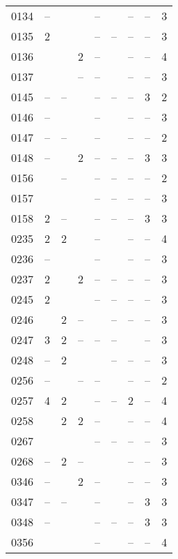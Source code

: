 \begin{center}
\begin{supertabular}{l c c c c c c c c}
0134 & -- &  &  & -- &  & -- & -- & 3 \\
0135 & 2 &  &  & -- & -- & -- & -- & 3 \\
0136 &  &  & 2 & -- &  & -- & -- & 4 \\
0137 &  &  & -- & -- &  & -- & -- & 3 \\
0145 & -- & -- &  & -- & -- & -- & 3 & 2 \\
0146 & -- &  &  & -- &  & -- & -- & 3 \\
0147 & -- & -- &  & -- &  & -- & -- & 2 \\
0148 & -- &  & 2 & -- & -- & -- & 3 & 3 \\
0156 &  & -- &  & -- & -- & -- & -- & 2 \\
0157 &  &  &  & -- & -- & -- & -- & 3 \\
0158 & 2 & -- &  & -- & -- & -- & 3 & 3 \\
0235 & 2 & 2 &  & -- &  & -- & -- & 4 \\
0236 & -- &  &  & -- &  & -- & -- & 3 \\
0237 & 2 &  & 2 & -- & -- & -- & -- & 3 \\
0245 & 2 &  &  & -- & -- & -- & -- & 3 \\
0246 &  & 2 & -- &  & -- & -- & -- & 3 \\
0247 & 3 & 2 & -- & -- & -- &  & -- & 3 \\
0248 & -- & 2 &  &  & -- & -- & -- & 3 \\
0256 & -- &  & -- & -- &  & -- & -- & 2 \\
0257 & 4 & 2 &  & -- & -- & 2 & -- & 4 \\
0258 &  & 2 & 2 & -- &  & -- & -- & 4 \\
0267 &  &  &  & -- & -- & -- & -- & 3 \\
0268 & -- & 2 & -- &  &  & -- & -- & 3 \\
0346 & -- &  & 2 & -- &  & -- & -- & 3 \\
0347 & -- & -- &  & -- &  & -- & 3 & 3 \\
0348 & -- &  &  & -- & -- & -- & 3 & 3 \\
0356 &  &  &  & -- &  & -- & -- & 4 \\

\end{supertabular}
\end{center}
